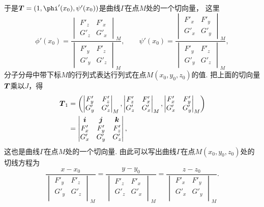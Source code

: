 于是\(\vb{T} = (1,\phi'(x_0),\psi'(x_0))\)是曲线\(\Gamma\)在点\(M\)处的一个切向量，
这里\[
	\phi'(x_0)
	= \frac{
			\begin{vmatrix}
				F'_z & F'_x \\
				G'_z & G'_x
			\end{vmatrix}_M
		}{
			\begin{vmatrix}
				F'_y & F'_z \\
				G'_y & G'_z
			\end{vmatrix}_M
		},
	\qquad
	\psi'(x_0)
	= \frac{
			\begin{vmatrix}
				F'_x & F'_y \\
				G'_x & G'_y
			\end{vmatrix}_M
		}{
			\begin{vmatrix}
				F'_y & F'_z \\
				G'_y & G'_z
			\end{vmatrix}_M
		},
\]
分子分母中带下标\(M\)的行列式表达行列式在点\(M(x_0,y_0,z_0)\)的值.
把上面的切向量\(\boldsymbol{T}\)乘以\(J\)，得\begin{align*}
	\boldsymbol{T}_1
	&= \left(
		\begin{vmatrix}
			F'_y & F'_z \\
			G'_y & G'_z \\
		\end{vmatrix}_M,
		\begin{vmatrix}
			F'_z & F'_x \\
			G'_z & G'_x \\
		\end{vmatrix}_M,
		\begin{vmatrix}
			F'_x & F'_y \\
			G'_x & G'_y \\
		\end{vmatrix}_M
	\right) \\
	&= \begin{vmatrix}
		\boldsymbol{i} & \boldsymbol{j} & \boldsymbol{k} \\
		F'_x & F'_y & F'_z \\
		G'_x & G'_y & G'_z
	\end{vmatrix}
	,
\end{align*}
这也是曲线\(\Gamma\)在点\(M\)处的一个切向量.
由此可以写出曲线\(\Gamma\)在点\(M(x_0,y_0,z_0)\)处的切线方程为
\begin{equation}\label{equation:多元函数微分学的几何应用.曲线的切线方程.变式2}
	\frac{x-x_0}{\begin{vmatrix}
		F'_y & F'_z \\
		G'_y & G'_z \\
	\end{vmatrix}_M}
	=\frac{y-y_0}{\begin{vmatrix}
		F'_z & F'_x \\
		G'_z & G'_x \\
	\end{vmatrix}_M}
	=\frac{z-z_0}{\begin{vmatrix}
		F'_x & F'_y \\
		G'_x & G'_y \\
	\end{vmatrix}_M}.
\end{equation}
